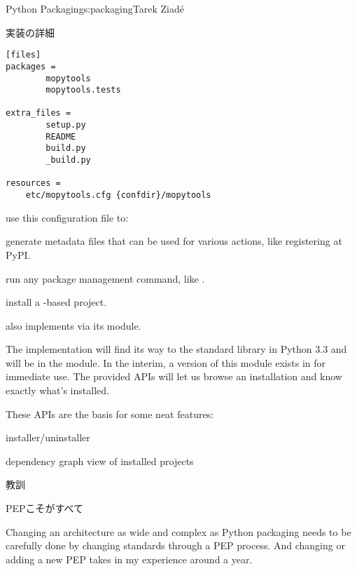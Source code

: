 \begin{aosachapter}{Python Packaging}{s:packaging}{Tarek Ziad\'{e}}
\begin{aosasect1}{実装の詳細}
\begin{verbatim}
[files]
packages =
        mopytools
        mopytools.tests

extra_files =
        setup.py
        README
        build.py
        _build.py

resources =
    etc/mopytools.cfg {confdir}/mopytools
\end{verbatim}

\noindent {} use this configuration file to:

\begin{aosaitemize}

  \item generate  metadata files that can be used for various
  actions, like registering at PyPI.

  \item run any package management command, like .

  \item install a -based project.

\end{aosaitemize}

\noindent
{} also implements  via its 
module.

The  implementation will find its way to the standard library
in Python 3.3 and will be in the  module. In the
interim, a version of this module exists in  for
immediate use.  The provided APIs will let us browse an installation
and know exactly what's installed.

These APIs are the basis for some neat  features:

\begin{aosaitemize}
  \item installer/uninstaller
  \item dependency graph view of installed projects
\end{aosaitemize}

\end{aosasect1}

\begin{aosasect1}{教訓}

\begin{aosasect2}{PEPこそがすべて}

Changing an architecture as wide and complex as Python packaging 
needs to be carefully done by changing standards through a
PEP process. And changing or adding a new PEP takes in my
experience around a year.


\end{aosasect2}
\end{aosasect1}
\end{aosachapter}
